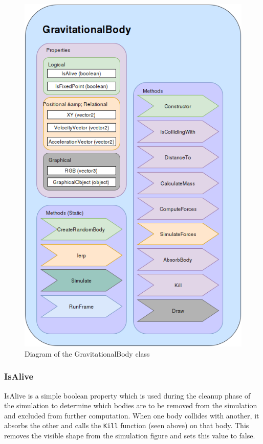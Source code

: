 \documentclass[11pt]{article}
\begin{document}
\begin{figure}[h]
	\centering
	\includegraphics[scale=0.4]{GravitationalBody}
	\caption{Diagram of the GravitationalBody class}
\end{figure}

\pagebreak
\subsubsection{IsAlive}
IsAlive is a simple boolean property which is used during the cleanup phase of the simulation to determine which bodies are to be removed from the simulation and excluded from further computation. When one body collides with another, it absorbs the other and calls the \verb|Kill| function (seen above) on that body. This removes the visible shape from the simulation figure and sets this value to false.
\end{document}
